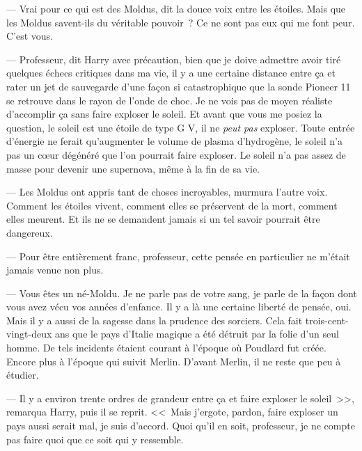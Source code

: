 --- Vrai pour ce qui est des Moldus, dit la douce voix entre les étoiles. Mais que les Moldus savent-ils du véritable pouvoir~? Ce ne sont pas eux qui me font peur. C'est vous.

--- Professeur, dit Harry avec précaution, bien que je doive admettre avoir tiré quelques échecs critiques dans ma vie, il y a une certaine distance entre ça et rater un jet de sauvegarde d'une façon si catastrophique que la sonde Pioneer 11 se retrouve dans le rayon de l'onde de choc. Je ne vois pas de moyen réaliste d'accomplir ça sans faire exploser le soleil. Et avant que vous me posiez la question, le soleil est une étoile de type G V, il ne \emph{peut pas} exploser. Toute entrée d'énergie ne ferait qu'augmenter le volume de plasma d'hydrogène, le soleil n'a pas un cœur dégénéré que l'on pourrait faire exploser. Le soleil n'a pas assez de masse pour devenir une supernova, même à la fin de sa vie.

--- Les Moldus ont appris tant de choses incroyables, murmura l'autre voix. Comment les étoiles vivent, comment elles se préservent de la mort, comment elles meurent. Et ils ne se demandent jamais si un tel savoir pourrait être dangereux.

--- Pour être entièrement franc, professeur, cette pensée en particulier ne m'était jamais venue non plus.

--- Vous êtes un né-Moldu. Je ne parle pas de votre sang, je parle de la façon dont vous avez vécu vos années d'enfance. Il y a là une certaine liberté de pensée, oui. Mais il y a aussi de la sagesse dans la prudence des sorciers. Cela fait trois-cent-vingt-deux ans que le pays d'Italie magique a été détruit par la folie d'un seul homme. De tels incidents étaient courant à l'époque où Poudlard fut créée. Encore plus à l'époque qui suivit Merlin. D'avant Merlin, il ne reste que peu à étudier.

--- Il y a environ trente ordres de grandeur entre ça et faire exploser le soleil~>>, remarqua Harry, puis il se reprit. <<~Mais j'ergote, pardon, faire exploser un pays aussi serait mal, je suis d'accord. Quoi qu'il en soit, professeur, je ne compte pas faire quoi que ce soit qui y ressemble.

